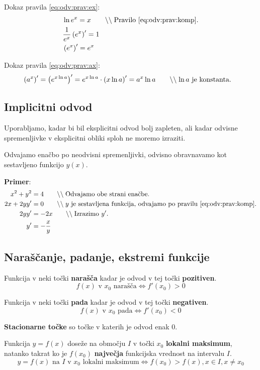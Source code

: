 \documentclass[a4paper,oneside,12pt,fleqn]{article}
\newcommand\krat\cdot
\newcommand{\comment}[1]{\ensuremath{\qquad\backslash\backslash\;}\textnormal{#1}}
\renewcommand\iff\Leftrightarrow
\numberwithin{equation}{section}
\begin{document}
Dokaz pravila \eqref{eq:odv:prav:ex}:
\begin{align*}
  & \ln e^x = x \comment{Pravilo \eqref{eq:odv:prav:komp}.} \\
  & \frac{1}{e^x}\left( e^x \right)' = 1 \\
  & \left( e^x \right)' = e^x
\end{align*}

Dokaz pravila \eqref{eq:odv:prav:ax}:
\begin{align*}
  & \left(a^x\right)' = \left( e^{x\ln a} \right)' = e^{x\ln a}\krat \left(x\ln a\right)'
  = a^x\ln a \comment{$\ln a$ je konstanta.}
\end{align*}

\subsection{Implicitni odvod}
\label{sec:odv:impl}
Uporabljamo, kadar bi bil eksplicitni odvod bolj zapleten, ali kadar odvisne spremenljivke
v eksplicitni obliki sploh ne moremo izraziti.

Odvajamo enačbo po neodvisni spremenljivki, odvisno obravnavamo kot sestavljeno funkcijo
$y(x)$.

\textbf{Primer}:
\begin{align*}
  x^2 + y^2 &= 4  \comment{Odvajamo obe strani enačbe.} \\
  2x + 2yy' &= 0  \comment{$y$ je sestavljena funkcija, odvajamo po pravilu
  \eqref{eq:odv:prav:komp}.} \\
  2yy' &= -2x \comment{Izrazimo $y'$.} \\
  y' &= -\frac{x}{y}
\end{align*}


\subsection{Naraščanje, padanje, ekstremi funkcije}
\label{sec:odv:eks}

Funkcija v neki točki \textbf{narašča} kadar je odvod v tej točki \textbf{pozitiven}.
\[ f(x) \text{ v } x_0 \text{ narašča} \iff f'(x_0) > 0 \]

Funkcija v neki točki \textbf{pada} kadar je odvod v tej točki \textbf{negativen}.
\[ f(x) \text{ v } x_0 \text{ pada} \iff f'(x_0) < 0 \]

\textbf{Stacionarne točke} so točke v katerih je odvod enak 0.

Funkcija $y=f(x)$ doseže na območju $I$ v točki $x_0$ \textbf{lokalni maksimum}, natanko takrat ko je $f(x_0)$
\textbf{največja} funkcijska vrednost na intervalu $I$.
\[ y = f(x) \text{ na } I \text{ v } x_0 \text{ lokalni maksimum} \iff
f(x_0) > f(x), x \in I, x \neq x_0 \]
\end{document}
